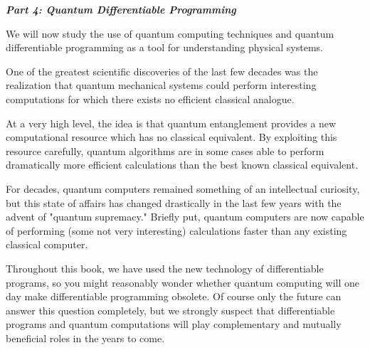 \documentclass[book.tex]{subfiles}
\begin{document}
\pagestyle{empty}
\vspace*{36 pt}
\begin{center}\Huge\bfseries\itshape
Part 4: Quantum Differentiable Programming
\end{center}

We will now study the use of quantum computing techniques and quantum differentiable programming as a tool for understanding physical systems.

One of the greatest scientific discoveries of the last few decades was the realization that quantum mechanical systems could perform interesting computations for which there exists no  efficient classical analogue. 

At a very high level, the idea is that quantum entanglement provides a new computational resource which has no classical equivalent. By exploiting this resource carefully, quantum algorithms are in some cases able to perform dramatically more efficient calculations than the best known classical equivalent.

For decades, quantum computers remained something of an intellectual curiosity, but this state of affairs has changed drastically in the last few years with the advent of "quantum supremacy." Briefly put, quantum computers are now capable of performing (some not very interesting) calculations faster than any existing classical computer. 

Throughout this book, we have used the new technology of differentiable programs, so you might reasonably wonder whether quantum computing will one day make differentiable programming obsolete. Of course only the future can answer this question completely, but we strongly suspect that differentiable programs and quantum computations will play complementary and mutually beneficial roles in the years to come.

%
%
%
%
%
%
%
\end{document}
